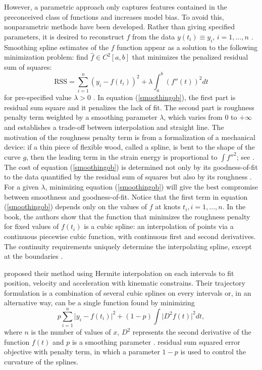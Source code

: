 However, a parametric approach only captures features contained in the preconceived class of functions \cite{yao2005functional} and increases model bias. To avoid this, nonparametric methods have been developed. Rather than giving specified parameters, it is desired to reconstruct $f$ from the data $y(t_i)\equiv y_i$, $i=1, \ldots, n$ \cite{craven1978smoothing}. Smoothing spline estimates of the $f$ function appear as a solution to the following minimization problem: find $\hat{f} \in \mathit{C}^2[a,b]$ that minimizes the penalized residual sum of squares:
\begin{equation}\label{smoothingob}
\mbox{RSS}=\sum_{i=1}^{n}\left(  y_i-f(t_i)\right) ^2+\lambda\int_{a}^{b} \left(f''(t)\right)^2dt
\end{equation}
for pre-specified value $\lambda>0$ \cite{aydin2012smoothing}. In equation (\ref{smoothingob}), the first part is residual sum square and it penalizes the lack of fit. The second part is roughness penalty term weighted by a smoothing parameter $\lambda$, which varies from 0 to $+\infty$ and establishes a trade-off between interpolation and straight line. The motivation of the roughness penalty term is from a formalization of a mechanical device: if a thin piece of flexible wood, called a spline, is bent to the shape of the curve $g$, then the leading term in the strain energy is proportional to $\int f''^2$; see \eg \cite{green1993nonparametric}. The cost of equation (\ref{smoothingob}) is determined not only by its goodness-of-fit to the data quantified by the residual sum of squares but also by its roughness \cite{schwarz2012geodesy}. For a given $\lambda$, minimizing equation (\ref{smoothingob}) will give the best compromise between smoothness and goodness-of-fit. Notice that the first term in equation (\ref{smoothingob}) depends only on the values of $f$ at knots $t_i, i=1, \ldots, n$. In the book, the authors \cite{green1993nonparametric} show that the function that minimizes the roughness penalty for fixed values of $f(t_i)$ is a cubic spline: an interpolation of points via a continuous piecewise cubic function, with continuous first and second derivatives. The continuity requirements uniquely determine the interpolating spline, except at the boundaries \cite{sealfon2005smoothing}.


\cite{zhang2013cubic} proposed their method using Hermite interpolation on each intervals to fit position, velocity and acceleration with kinematic constrains. Their trajectory formulation is a combination of several cubic splines on every intervals or, in an alternative way, can be a single function found by minimizing 
\begin{equation}
p\sum_{i=1}^{n}\lvert y_i-f(t_i) \rvert^2+(1-p)\int \lvert D^2f(t) \rvert^2dt,
\end{equation}
where $n$ is the number of values of $x$, $D^2$ represents the second derivative of the function $f(t)$ and $p$ is a smoothing parameter \cite{castro2006geometric}. 
residual sum squared error objective with penalty term\cite{castro2006geometric}, in which a parameter $1-p$ is used to control the curvature of the splines. 




